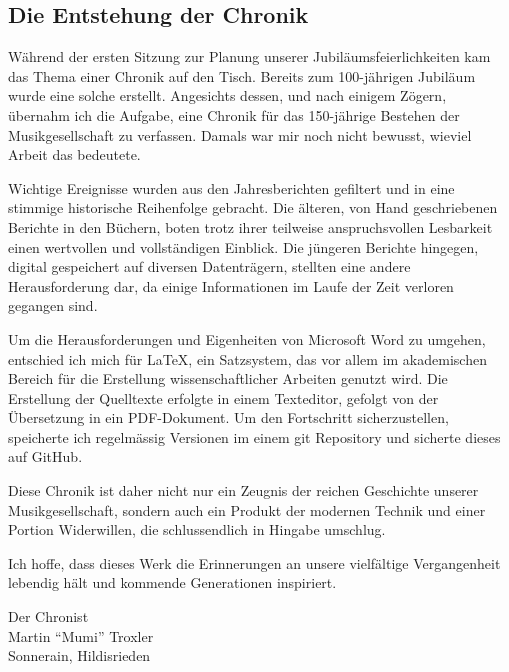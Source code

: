 
\cleardoublepage

\begin{multicols*}{2}

    \vphantom{1em}
    \vfill
    \columnbreak

    \section*{Die Entstehung der Chronik}

    Während der ersten Sitzung zur Planung unserer Jubiläumsfeierlichkeiten kam
    das Thema einer Chronik auf den Tisch. Bereits zum 100-jährigen Jubiläum
    wurde eine solche erstellt. Angesichts dessen, und nach einigem Zögern,
    übernahm ich die Aufgabe, eine Chronik für das 150-jährige Bestehen der
    Musikgesellschaft zu verfassen. Damals war mir noch nicht bewusst, wieviel
    Arbeit das bedeutete.

    Wichtige Ereignisse wurden aus den Jahresberichten gefiltert und in eine
    stimmige historische Reihenfolge gebracht. Die älteren, von Hand
    geschriebenen Berichte in den Büchern, boten trotz ihrer teilweise
    anspruchsvollen Lesbarkeit einen wertvollen und vollständigen Einblick. Die
    jüngeren Berichte hingegen, digital gespeichert auf diversen Datenträgern,
    stellten eine andere Herausforderung dar, da einige Informationen im Laufe
    der Zeit verloren gegangen sind.

    \bigskip

    Um die Herausforderungen und Eigenheiten von Microsoft Word zu umgehen,
    entschied ich mich für \LaTeX, ein Satzsystem, das vor allem im akademischen
    Bereich für die Erstellung wissenschaftlicher Arbeiten genutzt wird. Die
    Erstellung der Quelltexte erfolgte in einem Texteditor, gefolgt von der
    Übersetzung in ein PDF-Dokument. Um den Fortschritt sicherzustellen,
    speicherte ich regelmässig Versionen im einem git Repository und sicherte
    dieses auf GitHub.

    \bigskip

    Diese Chronik ist daher nicht nur ein Zeugnis der reichen Geschichte unserer
    Musikgesellschaft, sondern auch ein Produkt der modernen Technik und einer
    Portion Widerwillen, die schlussendlich in Hingabe umschlug.

    Ich hoffe, dass dieses Werk die Erinnerungen an unsere vielfältige
    Vergangenheit lebendig hält und kommende Generationen inspiriert.

    \bigskip

    \raggedleft Der Chronist\\
    \raggedleft Martin \enquote{Mumi} Troxler\\
    \raggedleft Sonnerain, Hildisrieden\\

\end{multicols*}
